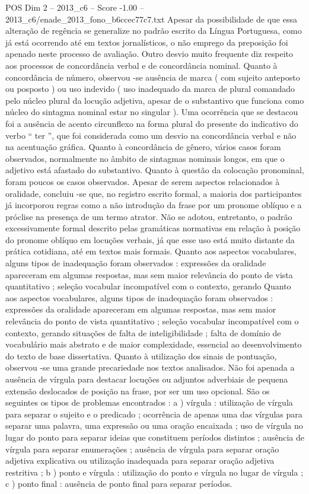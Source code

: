 \begin{textsample}{POS Dim 2 – 2013\_c6 – Score -1.00 – 2013\_c6/enade\_2013\_fono\_b6ccec77c7.txt}
Apesar da possibilidade de que essa alteração de regência se generalize no padrão escrito da Língua Portuguesa, como já está ocorrendo até em textos jornalísticos, o não emprego da preposição foi apenado neste processo de avaliação.
Outro desvio muito frequente diz respeito aos processos de concordância verbal e de concordância nominal.
Quanto à concordância de número, observou -se ausência de marca ( com sujeito anteposto ou posposto ) ou uso indevido ( uso inadequado da marca de plural comandado pelo núcleo plural da locução adjetiva, apesar de o substantivo que funciona como núcleo do sintagma nominal estar no singular ).
Uma ocorrência que se destacou foi a ausência de acento circunflexo na forma plural do presente do indicativo do verbo “ ter ”, que foi considerada como um desvio na concordância verbal e não na acentuação gráfica.
Quanto à concordância de gênero, vários casos foram observados, normalmente no âmbito de sintagmas nominais longos, em que o adjetivo está afastado do substantivo.
Quanto à questão da colocação pronominal, foram poucos os casos observados.
Apesar de serem aspectos relacionados à oralidade, concluiu -se que, no registro escrito formal, a maioria dos participantes já incorporou regras como a não introdução da frase por um pronome oblíquo e a próclise na presença de um termo atrator.
Não se adotou, entretanto, o padrão excessivamente formal descrito pelas gramáticas normativas em relação à posição do pronome oblíquo em locuções verbais, já que esse uso está muito distante da prática cotidiana, até em textos mais formais.
Quanto aos aspectos vocabulares, alguns tipos de inadequação foram observados : expressões da oralidade apareceram em algumas respostas, mas sem maior relevância do ponto de vista quantitativo ; seleção vocabular incompatível com o contexto, gerando Quanto aos aspectos vocabulares, alguns tipos de inadequação foram observados : expressões da oralidade apareceram em algumas respostas, mas sem maior relevância do ponto de vista quantitativo ; seleção vocabular incompatível com o contexto, gerando situações de falta de inteligibilidade ; falta de domínio de vocabulário mais abstrato e de maior complexidade, essencial ao desenvolvimento do texto de base dissertativa.
Quanto à utilização dos sinais de pontuação, observou -se uma grande precariedade nos textos analisados.
Não foi apenada a ausência de vírgula para destacar locuções ou adjuntos adverbiais de pequena extensão deslocados de posição na frase, por ser um uso opcional.
São os seguintes os tipos de problemas encontrados : a ) vírgula : utilização de vírgula para separar o sujeito e o predicado ; ocorrência de apenas uma das vírgulas para separar uma palavra, uma expressão ou uma oração encaixada ; uso de vírgula no lugar do ponto para separar ideias que constituem períodos distintos ; ausência de vírgula para separar enumerações ; ausência de vírgula para separar oração adjetiva explicativa ou utilização inadequada para separar oração adjetiva restritiva ; b ) ponto e vírgula : utilização do ponto e vírgula no lugar de vírgula ; c ) ponto final : ausência de ponto final para separar períodos.

\end{textsample}
